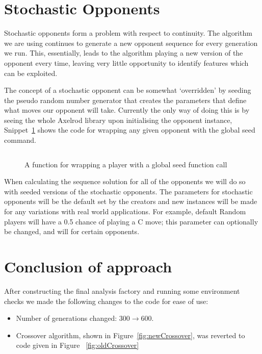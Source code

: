 \section{Stochastic Opponents}\label{sec:stochasticOpponents}
Stochastic opponents form a problem with respect to continuity.
The algorithm we are using continues to generate a new opponent sequence for every generation we run.
This, essentially, leads to the algorithm playing a new version of the opponent every time, leaving very little opportunity to identify features which can be exploited.

The concept of a stochastic opponent can be somewhat `overridden' by seeding the pseudo random number generator that creates the parameters that define what moves our opponent will take.
Currently the only way of doing this is by seeing the whole Axelrod library upon initialising the opponent instance, Snippet~\ref{code:wrappingFunction} shows the code for wrapping any given opponent with the global seed command.

\begin{figure}
    \inputminted{python}{code_snippets/classWrappingFunction.py}
    \caption{A function for wrapping a player with a global seed function call}\label{code:wrappingFunction}
\end{figure}

When calculating the sequence solution for all of the opponents we will do so with seeded versions of the stochastic opponents.
The parameters for stochastic opponents will be the default set by the creators and new instances will be made for any variations with real world applications.
For example, default Random players will have a 0.5 chance of playing a C move;
this parameter can optionally be changed, and will for certain opponents.

\section{Conclusion of approach}\label{sec:conclusionOfApproach}
After constructing the final analysis factory and running some environment checks we made the following changes to the code for ease of use:
\begin{itemize}
    \item Number of generations changed: $300\rightarrow600$.
    \item Crossover algorithm, shown in Figure~\ref{fig:newCrossover}, was reverted to code given in Figure ~\ref{fig:oldCrossover}
\end{itemize}

